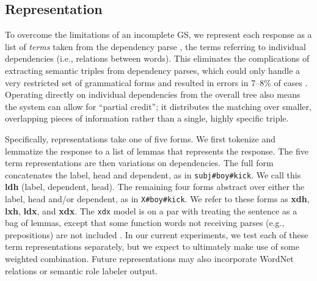 \documentclass[11pt,letterpaper]{article}
\newcommand{\param}[1]{\texttt{#1}}
\begin{document}
\subsection{Representation}
\label{sec:representation}

To overcome the limitations of an incomplete GS, we represent each
response as a list of \textit{terms} taken from the dependency parse
\citep{demarneffe:ea:06}, the terms referring to
individual dependencies (i.e., relations between words).
This eliminates the complications of extracting semantic triples from
dependency parses, which could only handle a very restricted set of
grammatical forms and resulted in errors in 7--8\% of cases
\citep{king:dickinson:13}. Operating directly on individual
dependencies from the overall tree also means the system can allow for
``partial credit''; it distributes the matching over smaller,
overlapping pieces of information rather than a single, highly
specific triple.

Specifically, representations take one of five forms.  We first
tokenize and lemmatize the response to a list of lemmas that
represents the response.
The five term representations are then variations on dependencies. The
full form concatenates the label, head and dependent, as in
\texttt{subj\#boy\#kick}. We call this \textbf{ldh} (label, dependent,
head). The remaining four forms abstract over either the label, head
and/or dependent, as in \texttt{X\#boy\#kick}. We refer to these forms
as \textbf{xdh}, \textbf{lxh}, \textbf{ldx}, and \textbf{xdx}. 
%
The \param{xdx} model is on a par with treating the sentence as a bag
of lemmas, except that some function words not receiving parses (e.g.,
prepositions) are not included \citep[see][]{king:dickinson:13}.
%
In our current experiments, we test each of these term representations
separately, but we expect to ultimately make use of some weighted
combination. Future representations may also incorporate WordNet
relations or semantic role labeler output.

\end{document}
